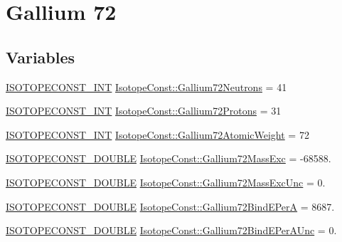\hypertarget{group___isotope_const-_gallium-_ga72}{}\section{Gallium 72}
\label{group___isotope_const-_gallium-_ga72}
\subsection*{Variables}
\begin{DoxyCompactItemize}
\item 
\mbox{\hyperlink{group___isotope_const-_macros_ga5f18360b3e99483a35c32d789e62621c}{I\+S\+O\+T\+O\+P\+E\+C\+O\+N\+S\+T\+\_\+\+I\+NT}} \mbox{\hyperlink{group___isotope_const-_gallium-_ga72_ga708b738f552738bd425ffd8454725b46}{Isotope\+Const\+::\+Gallium72\+Neutrons}} = 41
\item 
\mbox{\hyperlink{group___isotope_const-_macros_ga5f18360b3e99483a35c32d789e62621c}{I\+S\+O\+T\+O\+P\+E\+C\+O\+N\+S\+T\+\_\+\+I\+NT}} \mbox{\hyperlink{group___isotope_const-_gallium-_ga72_gabc28116753a5817a99d234cd892e06ff}{Isotope\+Const\+::\+Gallium72\+Protons}} = 31
\item 
\mbox{\hyperlink{group___isotope_const-_macros_ga5f18360b3e99483a35c32d789e62621c}{I\+S\+O\+T\+O\+P\+E\+C\+O\+N\+S\+T\+\_\+\+I\+NT}} \mbox{\hyperlink{group___isotope_const-_gallium-_ga72_gac66aa4c985c183c35af0f15fc7dbae80}{Isotope\+Const\+::\+Gallium72\+Atomic\+Weight}} = 72
\item 
\mbox{\hyperlink{group___isotope_const-_macros_ga8f45a7272ce02c0b4c65c44636ed719a}{I\+S\+O\+T\+O\+P\+E\+C\+O\+N\+S\+T\+\_\+\+D\+O\+U\+B\+LE}} \mbox{\hyperlink{group___isotope_const-_gallium-_ga72_gac3fbf693140e57610e1c8f3db0bf1c1f}{Isotope\+Const\+::\+Gallium72\+Mass\+Exc}} = -\/68588.
\item 
\mbox{\hyperlink{group___isotope_const-_macros_ga8f45a7272ce02c0b4c65c44636ed719a}{I\+S\+O\+T\+O\+P\+E\+C\+O\+N\+S\+T\+\_\+\+D\+O\+U\+B\+LE}} \mbox{\hyperlink{group___isotope_const-_gallium-_ga72_ga4ed0a07a82e7fa015e0133e09f1fa473}{Isotope\+Const\+::\+Gallium72\+Mass\+Exc\+Unc}} = 0.
\item 
\mbox{\hyperlink{group___isotope_const-_macros_ga8f45a7272ce02c0b4c65c44636ed719a}{I\+S\+O\+T\+O\+P\+E\+C\+O\+N\+S\+T\+\_\+\+D\+O\+U\+B\+LE}} \mbox{\hyperlink{group___isotope_const-_gallium-_ga72_gaacedd726eb832f7f9d0ecd1905cebc26}{Isotope\+Const\+::\+Gallium72\+Bind\+E\+PerA}} = 8687.
\item 
\mbox{\hyperlink{group___isotope_const-_macros_ga8f45a7272ce02c0b4c65c44636ed719a}{I\+S\+O\+T\+O\+P\+E\+C\+O\+N\+S\+T\+\_\+\+D\+O\+U\+B\+LE}} \mbox{\hyperlink{group___isotope_const-_gallium-_ga72_ga3d2951901e46637d2fcfa5072ecf983c}{Isotope\+Const\+::\+Gallium72\+Bind\+E\+Per\+A\+Unc}} = 0.

\end{DoxyCompactItemize}
